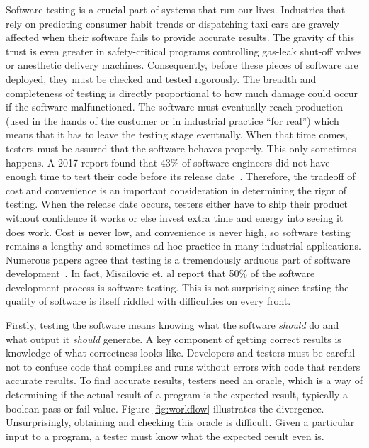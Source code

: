 
Software testing is a crucial part of systems that run our lives. Industries that rely on predicting consumer habit trends or dispatching taxi cars are gravely affected when their software fails to provide accurate results. The gravity of this trust is even greater in safety-critical programs controlling gas-leak shut-off valves or anesthetic delivery machines. Consequently, before these pieces of software are deployed, they must be checked and tested rigorously. The breadth and completeness of testing is directly proportional to how much damage could occur if the software malfunctioned. The software must eventually reach production (used in the hands of the customer or in industrial practice ``for real'') which means that it has to leave the testing stage eventually. When that time comes, testers must be assured that the software behaves properly. This only sometimes happens. A 2017 report found that 43\% of software engineers did not have enough time to test their code before its release date~\cite{Kassab-deFranco-Laplante}. Therefore, the tradeoff of cost and convenience is an important consideration in determining the rigor of testing. When the release date occurs, testers either have to ship their product without confidence it works or else invest extra time and energy into seeing it does work. Cost is never low, and convenience is never high, so software testing remains a lengthy and sometimes ad hoc practice in many industrial applications. Numerous papers agree that  testing is a tremendously arduous part of software development~\cite{Murphy:2007:PRT:1292414.1292425,Haller:2010:TDC:1838126.1838132,Muslu:2015:PDE:2771783.2771792,Tiwari:2013:RRT:2439976.2439982,Gupta:2011:MBA:2002931.2002932,Zeller:2017:STS:3105427.3105438,Garousi:2017:IWA:3084226.3084264,Kassab-deFranco-Laplante,Langdon:2017:IAT:3105427.3105429,Goffi:2016:AGO:2931037.2931061}. In fact, Misailovic et. al report that 50\% of the software development process is software testing. This is not surprising since testing the quality of software is itself riddled with difficulties on every front.

Firstly, testing the software means knowing what the software \textit{should} do and what output it \textit{should} generate. A key component of getting correct results is knowledge of what correctness looks like. Developers and testers must be careful not to confuse code that compiles and runs without errors with code that renders accurate results. To find accurate results, testers need an oracle, which is a way of determining if the actual result of a program is the expected result, typically a boolean pass or fail value. Figure \ref{fig:workflow} illustrates the divergence. Unsurprisingly, obtaining and checking this oracle is difficult. Given a particular input to a program, a tester must know what the expected result even is.

